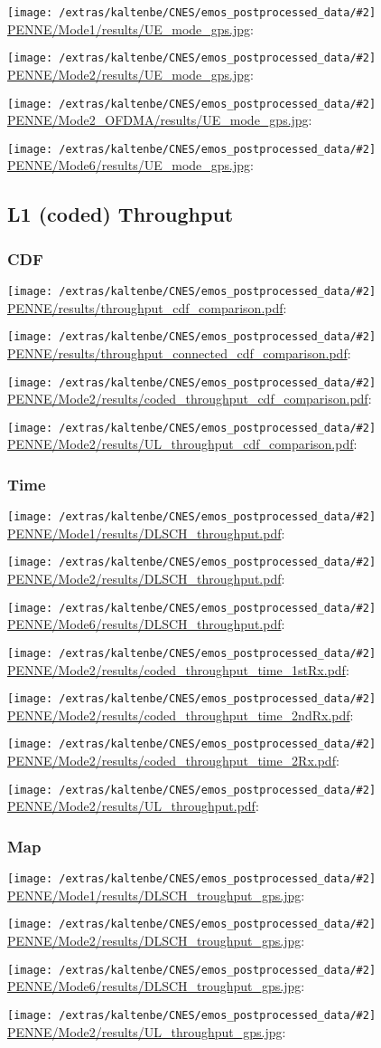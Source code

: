 \documentclass[a4paper,10pt]{article}
\newcommand{\printfile}[2][]{
 \begin{minipage}{8cm}
  \centering
  \texttt{[image: /extras/kaltenbe/CNES/emos\_postprocessed\_data/\#2]}
  \url{#2}: #1

 \end{minipage}
}
\begin{document}
\printfile{PENNE/Mode1/results/UE_mode_gps.jpg}
\printfile{PENNE/Mode2/results/UE_mode_gps.jpg}

\printfile{PENNE/Mode2_OFDMA/results/UE_mode_gps.jpg}
\printfile{PENNE/Mode6/results/UE_mode_gps.jpg}

\subsection{L1 (coded) Throughput}


\subsubsection{CDF}


\printfile{PENNE/results/throughput_cdf_comparison.pdf}
\printfile{PENNE/results/throughput_connected_cdf_comparison.pdf}

\printfile{PENNE/Mode2/results/coded_throughput_cdf_comparison.pdf}
\printfile{PENNE/Mode2/results/UL_throughput_cdf_comparison.pdf}

\subsubsection{Time}

\printfile{PENNE/Mode1/results/DLSCH_throughput.pdf}
\printfile{PENNE/Mode2/results/DLSCH_throughput.pdf}

\printfile{PENNE/Mode6/results/DLSCH_throughput.pdf}
\printfile{PENNE/Mode2/results/coded_throughput_time_1stRx.pdf}

\printfile{PENNE/Mode2/results/coded_throughput_time_2ndRx.pdf}
\printfile{PENNE/Mode2/results/coded_throughput_time_2Rx.pdf}

\printfile{PENNE/Mode2/results/UL_throughput.pdf}


\subsubsection{Map}

\printfile{PENNE/Mode1/results/DLSCH_troughput_gps.jpg}
\printfile{PENNE/Mode2/results/DLSCH_troughput_gps.jpg}

\printfile{PENNE/Mode6/results/DLSCH_troughput_gps.jpg}
\printfile{PENNE/Mode2/results/UL_throughput_gps.jpg}
\end{document}

